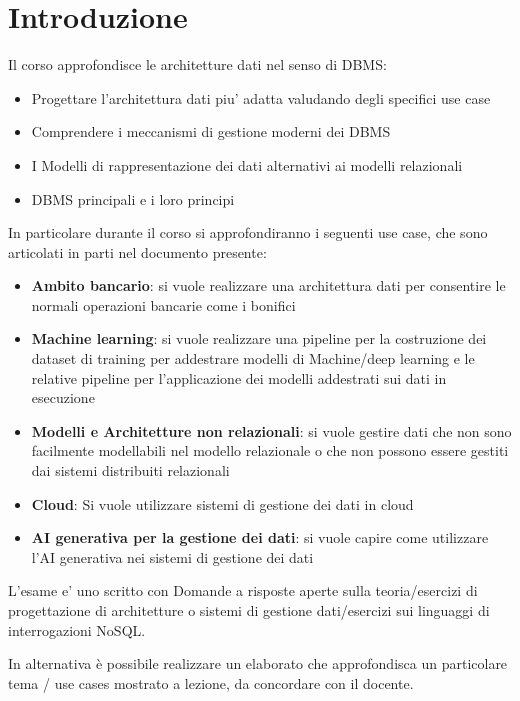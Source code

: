 \chapter{Introduzione}

Il corso approfondisce le architetture dati nel senso di DBMS:

\begin{itemize}
  \item Progettare l'architettura dati piu' adatta valudando degli specifici use case
  \item Comprendere i meccanismi di gestione moderni dei DBMS
  \item I Modelli di rappresentazione dei dati alternativi ai modelli relazionali
  \item DBMS principali e i loro principi
\end{itemize}

In particolare durante il corso si approfondiranno i seguenti use case, che sono articolati in parti nel documento presente:

\begin{itemize}
  \item \textbf{Ambito bancario}: si vuole realizzare una architettura dati per consentire le normali operazioni bancarie come i bonifici
  \item \textbf{Machine learning}: si vuole realizzare una pipeline per la costruzione dei dataset di training per addestrare modelli di Machine/deep learning e le relative pipeline per l’applicazione dei modelli addestrati sui dati in esecuzione
  \item \textbf{Modelli e Architetture non relazionali}: si vuole gestire dati che non sono facilmente modellabili nel modello relazionale o che non possono essere gestiti dai sistemi distribuiti relazionali
  \item \textbf{Cloud}: Si vuole utilizzare sistemi di gestione dei dati in cloud
  \item \textbf{AI generativa per la gestione dei dati}: si vuole capire come utilizzare l'AI generativa nei sistemi di gestione dei dati
\end{itemize}

L'esame e' uno scritto con Domande a risposte aperte sulla teoria/esercizi di progettazione di architetture o sistemi di gestione dati/esercizi sui linguaggi di interrogazioni NoSQL.

In alternativa è possibile realizzare un elaborato che approfondisca un particolare tema / use cases mostrato a lezione, da concordare con il docente.

